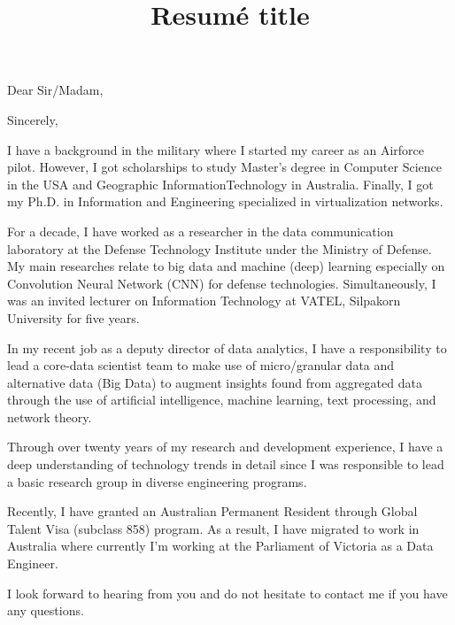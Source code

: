 \documentclass[11pt,a4paper,roman]{moderncv}        %
\title{Resumé title}                               %
\begin{document}
\recipient{}{}
\opening{Dear Sir/Madam,}
\closing{Sincerely,}
\makelettertitle

I have a background in the military where I started my career as an Airforce pilot. However, I got scholarships to study Master's degree in Computer Science in the USA  and Geographic InformationTechnology in Australia. Finally, I got my Ph.D. in Information and Engineering specialized in virtualization networks.

For a decade, I have worked as a researcher in the data communication laboratory at the Defense Technology Institute under the Ministry of Defense. My main researches relate to big data and machine (deep) learning especially on Convolution Neural Network (CNN) for defense technologies. Simultaneously, I was an invited lecturer on Information Technology at VATEL, Silpakorn University for five years.

In my recent job as a deputy director of data analytics, I have a responsibility to lead a core-data scientist team to make use of micro/granular data and alternative data (Big Data) to augment insights found from aggregated data through the use of artificial intelligence, machine learning, text processing, and network theory.

Through over twenty years of my research and development experience, I have a deep understanding of technology trends in detail since I was responsible to lead a basic research group in diverse engineering programs.

Recently, I have granted an Australian Permanent Resident through Global Talent Visa (subclass 858) program. As a result, I have migrated to work in Australia where currently I'm working at the Parliament of Victoria as a Data Engineer.

I look forward to hearing from you and do not hesitate to contact me if you have any questions.



\vspace{0.5cm}


\makeletterclosing
\end{document}
